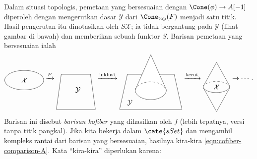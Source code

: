 Dalam situasi topologis, pemetaan yang bersesuaian dengan
$\Cone(\phi)\to A[-1]$ diperoleh dengan mengerutkan dasar
$\mathcal{Y}$ dari $\Cone_{\mathrm{top}}(F)$ menjadi satu titik. Hasil
pengerutan itu dinotasikan oleh $S\mathcal{X}$; ia tidak bergantung pada
$\mathcal{Y}$ (lihat gambar di bawah) dan memberikan sebuah funktor $S$.
Barisan pemetaan yang bersesuaian ialah
\begin{equation*}
	\begin{tikzpicture}[baseline=(O)]
		\draw (1, 0) ellipse[x radius=1, y radius=0.5] node {$\mathcal{X}$};
		\coordinate (O) at (0, 0);
	\end{tikzpicture}
	\xrightarrow{F}
	\begin{tikzpicture}[baseline=(O), xscale=0.5]
		\draw (0, 0.8) -- (-0.5, 0.8) -- (-1, -1) -- (3, -1) -- (2.5, 0.8) --cycle;
		\node at (1.2, 0) {$\mathcal{Y}$};
		\coordinate (O) at (0, 0.5);
	\end{tikzpicture}
	\xrightarrow{\text{inklusi}}
	\begin{tikzpicture}[baseline=(O), xscale=0.8]
		\draw (0, 0.8) -- (-0.5, 0.8) -- (-1, -1) node[xshift=1.5em,  yshift=1em] {$\mathcal{Y}$} -- (3, -1) -- (2.5, 0.8) --cycle;
		\filldraw[fill=white] (1, 1.8) -- (0, 0) arc[start angle=180, end angle=360, x radius=1, y radius=0.5] --cycle;
		\draw[dashed] (0, 0) arc[start angle=170, end angle=10, x radius=1, y radius=0.5];
		\coordinate (O) at (0, 0.5);
	\end{tikzpicture}
	\xrightarrow{\text{kerut}}
	\begin{tikzpicture}[baseline=(O), xscale=0.7, yscale=0.7]
		\draw (2, 0) -- (1, 1.8) -- (0, 0);
		\draw[dashed] (0, 0) arc[start angle=170, end angle=10, x radius=1, y radius=0.5];
		\draw (0, 0) arc[start angle=190, end angle=350, x radius=1, y radius=0.5];
		\node at (1, 0) {$\mathcal{X}$};
		\draw (0, 0) -- (1, -1.8) -- (2, 0);
		\coordinate (O) at (0, 0.5);
	\end{tikzpicture}
	\to \cdots .
\end{equation*}
Barisan ini disebut \emph{barisan kofiber} yang dihasilkan oleh $f$
(lebih tepatnya, versi tanpa titik pangkal). Jika kita bekerja dalam
$\cate{sSet}$ dan mengambil kompleks rantai dari barisan yang bersesuaian,
hasilnya kira-kira \eqref{eqn:cofiber-comparison-A}. Kata ``kira-kira''
diperlukan karena:
